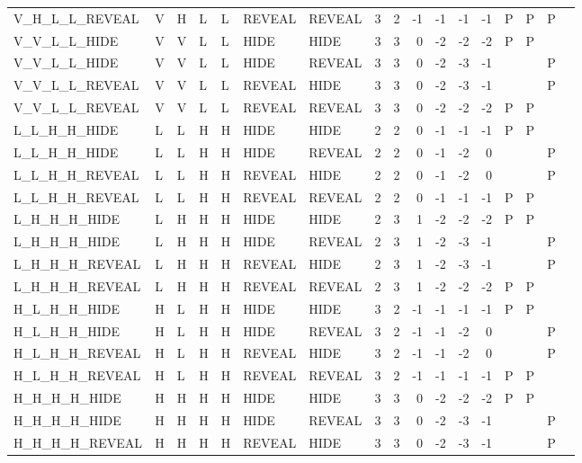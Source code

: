 \begin{longtable}{lllllllrrrrrrllll}
  V\_H\_L\_L\_REVEAL & V & H & L & L & REVEAL & REVEAL & 3 & 2 & -1 & -1 & -1 & -1 & P & P & P &  \\ 
  V\_V\_L\_L\_HIDE & V & V & L & L & HIDE & HIDE & 3 & 3 & 0 & -2 & -2 & -2 & P & P &  &  \\ 
  V\_V\_L\_L\_HIDE & V & V & L & L & HIDE & REVEAL & 3 & 3 & 0 & -2 & -3 & -1 &  &  & P &  \\ 
  V\_V\_L\_L\_REVEAL & V & V & L & L & REVEAL & HIDE & 3 & 3 & 0 & -2 & -3 & -1 &  &  & P &  \\ 
  V\_V\_L\_L\_REVEAL & V & V & L & L & REVEAL & REVEAL & 3 & 3 & 0 & -2 & -2 & -2 & P & P &  &  \\ 
  L\_L\_H\_H\_HIDE & L & L & H & H & HIDE & HIDE & 2 & 2 & 0 & -1 & -1 & -1 & P & P &  &  \\ 
  L\_L\_H\_H\_HIDE & L & L & H & H & HIDE & REVEAL & 2 & 2 & 0 & -1 & -2 & 0 &  &  & P &  \\ 
  L\_L\_H\_H\_REVEAL & L & L & H & H & REVEAL & HIDE & 2 & 2 & 0 & -1 & -2 & 0 &  &  & P &  \\ 
  L\_L\_H\_H\_REVEAL & L & L & H & H & REVEAL & REVEAL & 2 & 2 & 0 & -1 & -1 & -1 & P & P &  &  \\ 
  L\_H\_H\_H\_HIDE & L & H & H & H & HIDE & HIDE & 2 & 3 & 1 & -2 & -2 & -2 & P & P &  &  \\ 
  L\_H\_H\_H\_HIDE & L & H & H & H & HIDE & REVEAL & 2 & 3 & 1 & -2 & -3 & -1 &  &  & P &  \\ 
  L\_H\_H\_H\_REVEAL & L & H & H & H & REVEAL & HIDE & 2 & 3 & 1 & -2 & -3 & -1 &  &  & P &  \\ 
  L\_H\_H\_H\_REVEAL & L & H & H & H & REVEAL & REVEAL & 2 & 3 & 1 & -2 & -2 & -2 & P & P &  &  \\ 
  H\_L\_H\_H\_HIDE & H & L & H & H & HIDE & HIDE & 3 & 2 & -1 & -1 & -1 & -1 & P & P &  &  \\ 
  H\_L\_H\_H\_HIDE & H & L & H & H & HIDE & REVEAL & 3 & 2 & -1 & -1 & -2 & 0 &  &  & P &  \\ 
  H\_L\_H\_H\_REVEAL & H & L & H & H & REVEAL & HIDE & 3 & 2 & -1 & -1 & -2 & 0 &  &  & P &  \\ 
  H\_L\_H\_H\_REVEAL & H & L & H & H & REVEAL & REVEAL & 3 & 2 & -1 & -1 & -1 & -1 & P & P &  &  \\ 
  H\_H\_H\_H\_HIDE & H & H & H & H & HIDE & HIDE & 3 & 3 & 0 & -2 & -2 & -2 & P & P &  &  \\ 
  H\_H\_H\_H\_HIDE & H & H & H & H & HIDE & REVEAL & 3 & 3 & 0 & -2 & -3 & -1 &  &  & P &  \\ 
  H\_H\_H\_H\_REVEAL & H & H & H & H & REVEAL & HIDE & 3 & 3 & 0 & -2 & -3 & -1 &  &  & P &  \\ 

\end{longtable}
